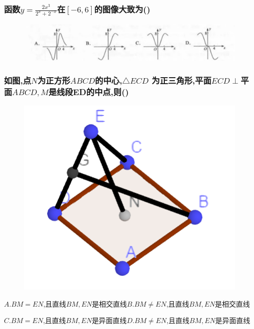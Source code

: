 \documentclass[UTF8]{ctexart}
\begin{document}
\subsubsection{函数$y=\frac{2x^3}{2^x+2^{-x}}$在$[-6,6]$的图像大致为\hfill (\qquad)}
\begin{figure}[H]
    \centering
    \includegraphics[width=1\textwidth]{pics/2019_3_7.png}
\end{figure}

\subsubsection{如图,点$N$为正方形$ABCD$的中心,$\triangle ECD$
    为正三角形,平面$ECD\perp$平面$ABCD,M$是线段ED的中点,则\hfill (\qquad)}
\begin{figure}[H]
    \centering
    \includegraphics{pics/2019_3_8.png}
\end{figure}
$A. BM=EN$,且直线$BM,EN$是相交直线\hfill $B. BM\neq EN$,且直线$BM,EN$是相交直线\hfill \quad \par
$C. BM=EN$,且直线$BM,EN$是异面直线\hfill $D. BM\neq EN$,且直线$BM,EN$是异面直线\hfill \quad
\end{document}

